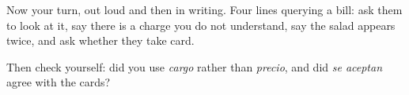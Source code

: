\begin{tcolorbox}[breakable,colback=teal!4,colframe=teal!35!black,title={Before you move on}]
Now your turn, out loud and then in writing. Four lines querying a bill: ask them to look at it, say there is a charge you do not understand, say the salad appears twice, and ask whether they take card.

Then check yourself: did you use \emph{cargo} rather than \emph{precio}, and did \emph{se aceptan} agree with the cards?
\end{tcolorbox}
